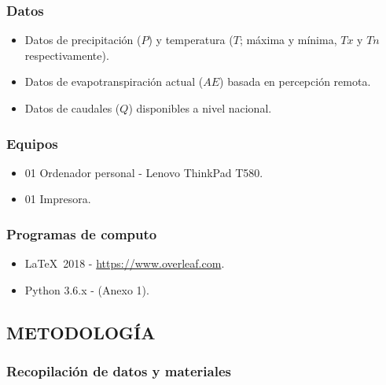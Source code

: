 \documentclass[12pt]{article}
\begin{document}
\subsubsection{Datos}

\begin{itemize}
  
  \item Datos de precipitación ($P$) y temperatura ($T$; máxima y mínima, $Tx$ y $Tn$ respectivamente).
  
  \item Datos de evapotranspiración actual ($AE$) basada en percepción remota.
  
  \item Datos de caudales ($Q$) disponibles a nivel nacional.

\end{itemize}

\subsubsection{Equipos}

\begin{itemize}
  \item 01 Ordenador personal - Lenovo ThinkPad T580.
  \item 01 Impresora.
\end{itemize}

\subsubsection{Programas de computo}

\begin{itemize}
  \item \LaTeX\  2018 - \url{https://www.overleaf.com}.
  \item Python 3.6.x - (Anexo 1).
\end{itemize}

\subsection{METODOLOGÍA}

\subsubsection{Recopilación de datos y materiales}
\end{document}
